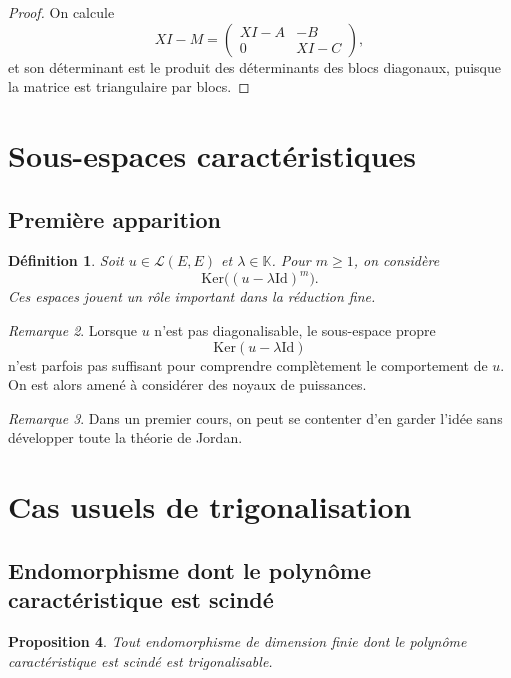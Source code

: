 \documentclass[11pt,a4paper]{article}
\newtheorem{definition}{Définition}[section]
\newtheorem{proposition}[definition]{Proposition}
\theoremstyle{remark}
\newtheorem{remarque}[definition]{Remarque}
\newcommand{\K}{\mathbb{K}}
\newcommand{\Ker}{\mathrm{Ker}}
\newcommand{\id}{\mathrm{Id}}
\begin{document}
\begin{proof}
On calcule
\[
XI-M=
\begin{pmatrix}
XI-A & -B\\
0 & XI-C
\end{pmatrix},
\]
et son déterminant est le produit des déterminants des blocs diagonaux, puisque la matrice est triangulaire par blocs.
\end{proof}

\section{Sous-espaces caractéristiques}

\subsection{Première apparition}

\begin{definition}
Soit \(u\in\mathcal L(E,E)\) et \(\lambda\in\K\). Pour \(m\ge 1\), on considère
\[
\Ker\big((u-\lambda\id)^m\big).
\]
Ces espaces jouent un rôle important dans la réduction fine.
\end{definition}

\begin{remarque}
Lorsque \(u\) n’est pas diagonalisable, le sous-espace propre
\[
\Ker(u-\lambda\id)
\]
n’est parfois pas suffisant pour comprendre complètement le comportement de \(u\). On est alors amené à considérer des noyaux de puissances.
\end{remarque}

\begin{remarque}
Dans un premier cours, on peut se contenter d’en garder l’idée sans développer toute la théorie de Jordan.
\end{remarque}

\section{Cas usuels de trigonalisation}

\subsection{Endomorphisme dont le polynôme caractéristique est scindé}

\begin{proposition}
Tout endomorphisme de dimension finie dont le polynôme caractéristique est scindé est trigonalisable.
\end{proposition}
\end{document}
